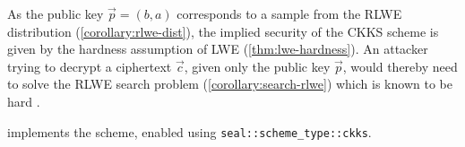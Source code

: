 As the public key $\vec{p} = (b, a)$ corresponds to a sample from the RLWE distribution (\cref{corollary:rlwe-dist}), the implied security of the CKKS scheme is given by the hardness assumption of LWE (\cref{thm:lwe-hardness}).
An attacker trying to decrypt a ciphertext $\vec{c}$, given only the public key $\vec{p}$, would thereby need to solve the RLWE search problem (\cref{corollary:search-rlwe}) which is known to be hard \parencite{2010-rlwe-original}.

\cite{seal-4.0} implements the scheme, enabled using \texttt{seal::scheme\_type::ckks}.
